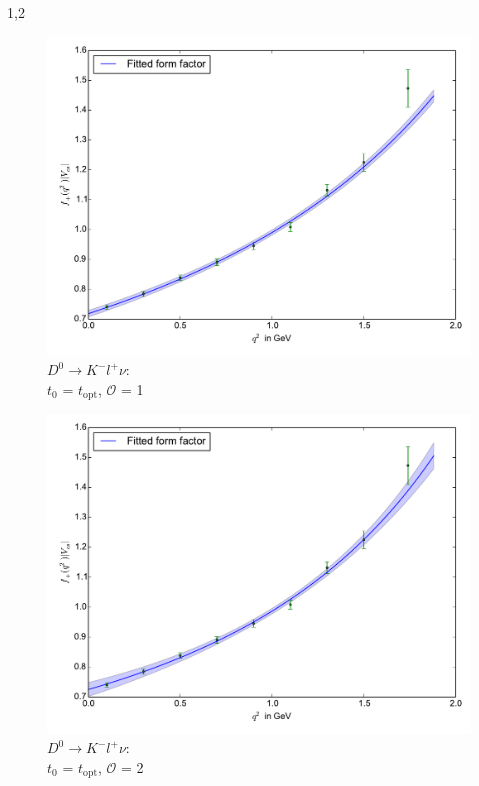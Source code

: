 \documentclass[11pt,a4paper,twoside,draft]{report}
\begin{document}
\begin{spacing}{1,2}
 \begin{minipage}[H]{0.45\textwidth}
 \begin{figure}[H]
 \includegraphics[width=1\textwidth]{Fit/D0-1Ord-t0.pdf}
 \caption{$D^0\rightarrow K^- l^+ \nu$: \\$t_0$ = $t_{\text{opt}}$, $\mathcal{O}$ = 1}
 \label{pic_D0-1Ord-t0}
 \end{figure}
 \end{minipage}
 \hfill
 \begin{minipage}[H]{0.45\textwidth}
 \begin{figure}[H]
 \includegraphics[width=1\textwidth]{Fit/D0-2Ord-t0.pdf}
 \caption{$D^0\rightarrow K^- l^+ \nu$: \\$t_0$ = $t_{\text{opt}}$, $\mathcal{O}$ = 2}
 \label{pic_D0-2Ord-t0}
 \end{figure}
 \end{minipage}
 

\end{spacing}
\end{document}
